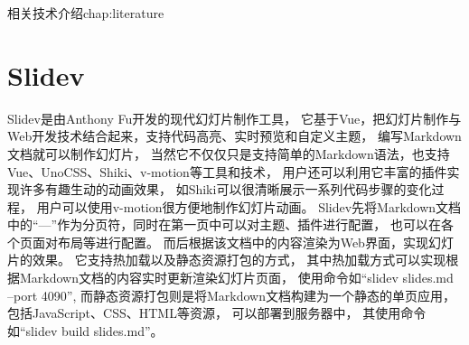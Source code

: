 \begin{cuzchapter}{相关技术介绍}{chap:literature}




	\section{Slidev}\label{sec:slideshow-tools}


	Slidev是由Anthony Fu开发的现代幻灯片制作工具，
	它基于Vue，把幻灯片制作与Web开发技术结合起来，支持代码高亮、实时预览和自定义主题，
	编写Markdown文档就可以制作幻灯片，
	当然它不仅仅只是支持简单的Markdown语法，也支持Vue、UnoCSS、Shiki、v-motion等工具和技术，
	用户还可以利用它丰富的插件实现许多有趣生动的动画效果，
	如Shiki可以很清晰展示一系列代码步骤的变化过程，
	用户可以使用v-motion很方便地制作幻灯片动画。
	Slidev先将Markdown文档中的“---”作为分页符，同时在第一页中可以对主题、插件进行配置，
	也可以在各个页面对布局等进行配置。
	而后根据该文档中的内容渲染为Web界面，实现幻灯片的效果。
	它支持热加载以及静态资源打包的方式，
	其中热加载方式可以实现根据Markdown文档的内容实时更新渲染幻灯片页面，
	使用命令如“slidev slides.md --port 4090”,
	而静态资源打包则是将Markdown文档构建为一个静态的单页应用，包括JavaScript、CSS、HTML等资源，
	可以部署到服务器中，
	其使用命令如“slidev build slides.md”。
	

\end{cuzchapter}
